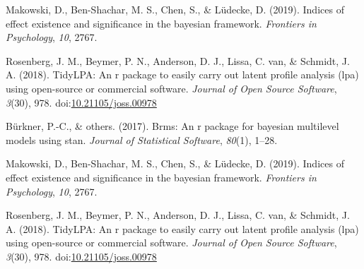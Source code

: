 \documentclass[man]{apa6}
\begin{document}
\leavevmode\hypertarget{ref-makowski2019}{}%
Makowski, D., Ben-Shachar, M. S., Chen, S., \& Lüdecke, D. (2019). Indices of effect existence and significance in the bayesian framework. \emph{Frontiers in Psychology}, \emph{10}, 2767.

\leavevmode\hypertarget{ref-R-tidyLPA}{}%
Rosenberg, J. M., Beymer, P. N., Anderson, D. J., Lissa, C. van, \& Schmidt, J. A. (2018). TidyLPA: An r package to easily carry out latent profile analysis (lpa) using open-source or commercial software. \emph{Journal of Open Source Software}, \emph{3}(30), 978. doi:\href{https://doi.org/10.21105/joss.00978}{10.21105/joss.00978}

\leavevmode\hypertarget{ref-burkner2017}{}%
Bürkner, P.-C., \& others. (2017). Brms: An r package for bayesian multilevel models using stan. \emph{Journal of Statistical Software}, \emph{80}(1), 1--28.

\leavevmode\hypertarget{ref-makowski2019}{}%
Makowski, D., Ben-Shachar, M. S., Chen, S., \& Lüdecke, D. (2019). Indices of effect existence and significance in the bayesian framework. \emph{Frontiers in Psychology}, \emph{10}, 2767.

\leavevmode\hypertarget{ref-R-tidyLPA}{}%
Rosenberg, J. M., Beymer, P. N., Anderson, D. J., Lissa, C. van, \& Schmidt, J. A. (2018). TidyLPA: An r package to easily carry out latent profile analysis (lpa) using open-source or commercial software. \emph{Journal of Open Source Software}, \emph{3}(30), 978. doi:\href{https://doi.org/10.21105/joss.00978}{10.21105/joss.00978}

\endgroup
\end{document}
